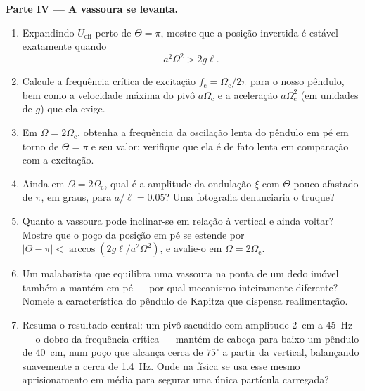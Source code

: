 \begin{problem}
\medskip\noindent\textbf{Parte IV --- A vassoura se levanta.}
\begin{enumerate}[resume]
  \item Expandindo $U_{\text{eff}}$ perto de $\Theta = \pi$, mostre que
        a posição invertida é estável exatamente quando
        \[
        a^2\Omega^2 > 2g\ell .
        \]
  \item Calcule a frequência crítica de excitação $f_{\text{c}} =
        \Omega_{\text{c}}/2\pi$ para o nosso pêndulo, bem como a
        velocidade máxima do pivô $a\Omega_{\text{c}}$ e a aceleração
        $a\Omega_{\text{c}}^2$ (em unidades de $g$) que ela exige.
  \item Em $\Omega = 2\Omega_{\text{c}}$, obtenha a frequência da
        oscilação lenta do pêndulo em pé em torno de $\Theta = \pi$ e
        seu valor; verifique que ela é de fato lenta em comparação
        com a excitação.
  \item Ainda em $\Omega = 2\Omega_{\text{c}}$, qual é a amplitude da
        ondulação $\xi$ com $\Theta$ pouco afastado de $\pi$, em graus,
        para $a/\ell = 0.05$? Uma fotografia denunciaria o truque?
  \item Quanto a vassoura pode inclinar-se em relação à vertical e
        ainda voltar? Mostre que o poço da posição em pé se estende
        por $|\Theta - \pi| <
        \arccos(2g\ell/a^2\Omega^2)$, e avalie-o em $\Omega =
        2\Omega_{\text{c}}$.
  \item Um malabarista que equilibra uma vassoura na ponta de um dedo
        imóvel também a mantém em pé --- por qual mecanismo
        inteiramente diferente? Nomeie a característica do pêndulo de
        Kapitza que dispensa realimentação.
  \item Resuma o resultado central: um pivô sacudido com amplitude
        \qty{2}{cm} a \qty{45}{Hz} --- o dobro da frequência crítica
        --- mantém de cabeça para baixo um pêndulo de \qty{40}{cm},
        num poço que alcança cerca de $75^\circ$ a partir da vertical,
        balançando suavemente a cerca de \qty{1.4}{Hz}. Onde na física
        se usa esse mesmo aprisionamento em média para segurar uma
        única partícula carregada?
\end{enumerate}
\end{problem}
